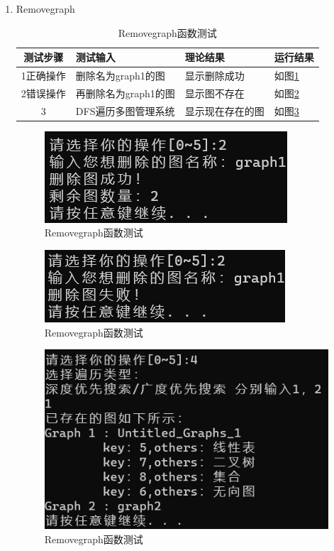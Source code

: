 \documentclass[supercite]{Experimental_Report}
\theoremstyle{definition}
\begin{document}
\begin{enumerate}
	\item Removegraph
	\begin{table}[h!]
		\begin{center}
			\caption{Removegraph函数测试}
			\begin{tabular}{|c|p{4cm}<{\centering}|p{4cm}<{\centering}|p{4cm}<{\centering}|} 
				\hline
				\textbf{测试步骤} & \textbf{测试输入} & \textbf{理论结果} & \textbf{运行结果} \\
				\hline
				1正确操作 & 删除名为graph1的图 &显示删除成功 &如图\ref{fig2-17-1}\\
				\hline
				2错误操作 & 再删除名为graph1的图 &显示图不存在 &如图\ref{fig2-17-2}\\
				\hline
				3 & DFS遍历多图管理系统 &显示现在存在的图 &如图\ref{fig2-17-3}\\
				\hline
			\end{tabular}
		\end{center}
	\end{table}
	\begin{figure}[H] %
		\begin{center}
			\includegraphics[width=0.5\linewidth]{images/graph/18-2-1.png}
			\caption{ Removegraph函数测试}
			\label{fig2-17-1}
		\end{center}
	\end{figure}
	\begin{figure}[H] %
		\begin{center}
			\includegraphics[width=0.5\linewidth]{images/graph/18-2-2.png}
			\caption{ Removegraph函数测试}
			\label{fig2-17-2}
		\end{center}
	\end{figure}
	\begin{figure}[H] %
		\begin{center}
			\includegraphics[width=0.5\linewidth]{images/graph/18-4-1.png}
			\caption{ Removegraph函数测试}
			\label{fig2-17-3}
		\end{center}
	\end{figure}
	

\end{enumerate}
\end{document}
